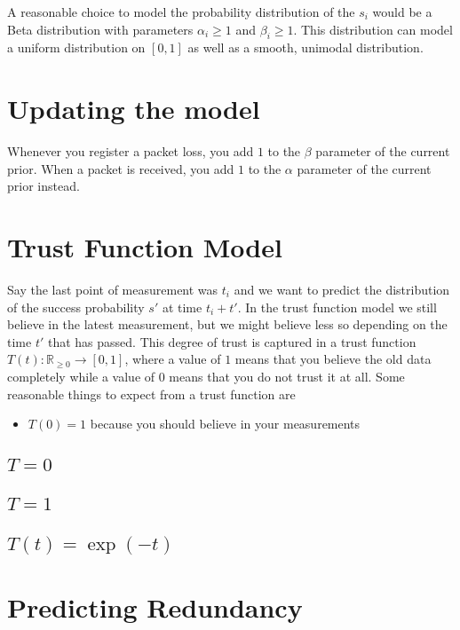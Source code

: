 \documentclass[10pt,a4paper]{article}
\begin{document}
A reasonable choice to model the probability distribution of the $s_{i}$ would be a Beta distribution with parameters $\alpha_{i} \ge 1$ and $\beta_{i} \ge 1$.
This distribution can model a uniform distribution on $[0, 1]$ as well as a smooth, unimodal distribution.

\section{Updating the model}

Whenever you register a packet loss, you add $1$ to the $\beta$ parameter of the current prior.
When a packet is received, you add $1$ to the $\alpha$ parameter of the current prior instead.

\section{Trust Function Model}\label{sec:trust_function}

Say the last point of measurement was $t_{i}$ and we want to predict the distribution of the success probability $s'$ at time $t_{i} + t'$.
In the trust function model we still believe in the latest measurement, but we might believe less so depending on the time $t'$ that has passed.
This degree of trust is captured in a trust function $T(t) : \mathbb{R}_{\ge 0} \rightarrow [0, 1]$, where a value of $1$ means that you believe the old data completely while a value of $0$ means that you do not trust it at all.
Some reasonable things to expect from a trust function are
\begin{itemize}
\item $T(0) = 1$ because you should believe in your measurements
\end{itemize}

\subsection{$T = 0$}

\subsection{$T = 1$}

\subsection{$T(t) = \exp(-t)$}

\section{Predicting Redundancy}
\end{document}

